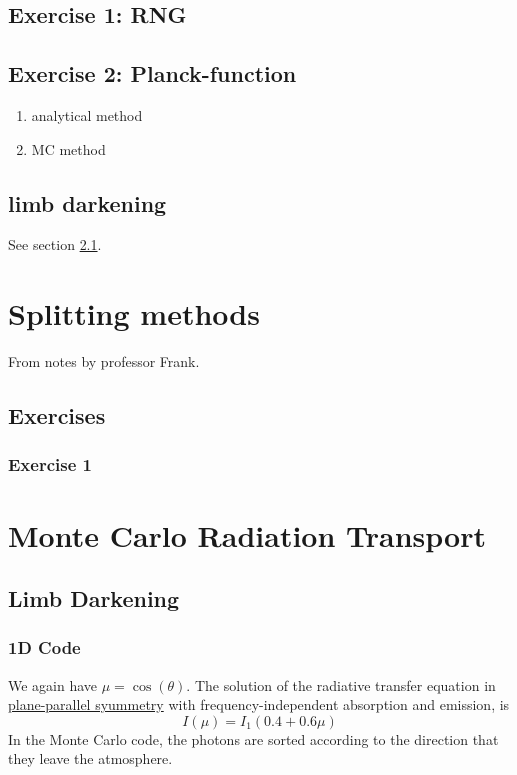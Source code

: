 \documentclass[../main/main.tex]{subfiles}
\begin{document}
\newpage
\subsection{Exercise 1: RNG}
\subsection{Exercise 2: Planck-function}
\begin{enumerate}
\item analytical method
\item MC method
\end{enumerate}
\subsection{limb darkening}
See section \ref{limb_darkening_discussion}.

\newpage
\section{Splitting methods}
From notes by professor Frank.
\subsection{Exercises}
\subsubsection{Exercise 1}

\newpage
\section{Monte Carlo Radiation Transport}
\subsection{Limb Darkening}
\label{limb_darkening_discussion}

\subsubsection{1D Code}
We again have $\mu = \cos(\theta)$. The solution of the radiative transfer equation in \underline{plane-parallel syummetry} with frequency-independent absorption and emission, is 
\begin{equation}
I(\mu) = I_1 (0.4 + 0.6\mu)
\end{equation}
In the Monte Carlo code, the photons are sorted according to the direction that they leave the atmosphere.
\end{document}
